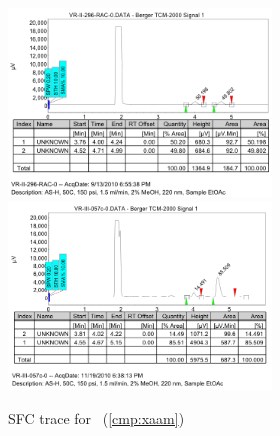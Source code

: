 \begin{figure}[h]
\centering
\includegraphics[width=2.75in]{chp_asymmetric/images/sfc/xaam-rac.png}
\includegraphics[width=2.75in]{chp_asymmetric/images/sfc/xaam.png}
\caption{SFC trace for \CMPxaam~(\ref{cmp:xaam})}
\vspace{-10pt}
\end{figure}

